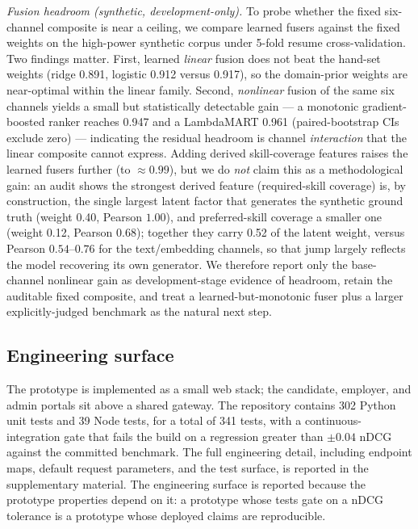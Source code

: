 \emph{Fusion headroom (synthetic, development-only).} To probe whether the fixed six-channel composite is
near a ceiling, we compare learned fusers against the fixed weights on the high-power synthetic corpus under
5-fold resume cross-validation. Two findings matter. First, learned \emph{linear} fusion does not beat the
hand-set weights (ridge 0.891, logistic 0.912 versus 0.917), so the domain-prior weights are near-optimal
within the linear family. Second, \emph{nonlinear} fusion of the same six channels yields a small but
statistically detectable gain --- a monotonic gradient-boosted ranker reaches 0.947 and a LambdaMART 0.961
(paired-bootstrap CIs exclude zero) --- indicating the residual headroom is channel \emph{interaction} that
the linear composite cannot express. Adding derived skill-coverage features raises the learned fusers
further (to $\approx 0.99$), but we do \emph{not} claim this as a methodological gain: an audit shows the
strongest derived feature (required-skill coverage) is, by construction, the single largest latent factor
that generates the synthetic ground truth (weight 0.40, Pearson $1.00$), and preferred-skill coverage a
smaller one (weight 0.12, Pearson $0.68$); together they carry 0.52 of the latent weight, versus Pearson
$0.54$--$0.76$ for the text/embedding channels, so that jump largely reflects the model recovering its own
generator. We therefore report only the base-channel nonlinear gain as development-stage evidence of
headroom, retain the auditable fixed composite, and treat a learned-but-monotonic fuser plus a larger
explicitly-judged benchmark as the natural next step.



\subsection{Engineering surface}
The prototype is implemented as a small web stack; the candidate, employer, and admin portals sit above a shared gateway.
The repository contains 302 Python unit tests and 39 Node tests, for a total of 341 tests, with a continuous-integration gate that fails the build on a regression greater than $\pm 0.04$ nDCG against the committed benchmark.
The full engineering detail, including endpoint maps, default request parameters, and the test surface, is reported in the supplementary material.
The engineering surface is reported because the prototype properties depend on it: a prototype whose tests gate on a nDCG tolerance is a prototype whose deployed claims are reproducible.
